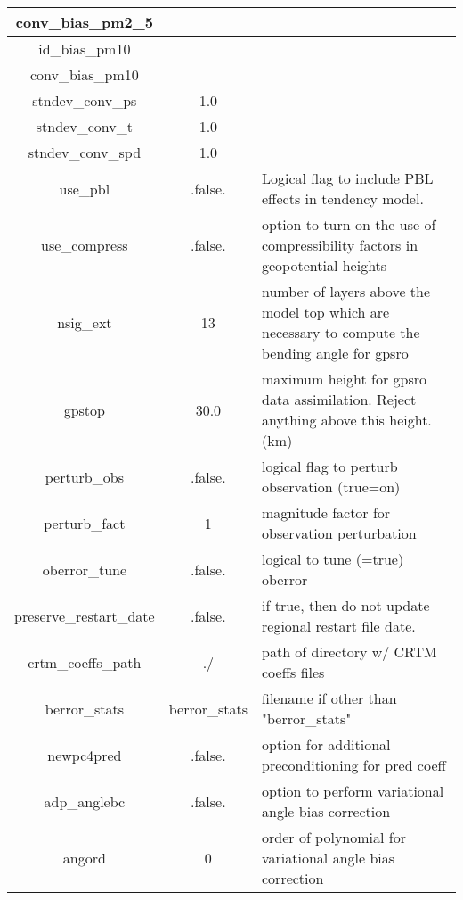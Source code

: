 \begin{table}[h]
\begin{tabular}{| c | c | p{9cm} |}
  \hline
  conv\_bias\_pm2\_5 & & \\
  \hline
  id\_bias\_pm10 & & \\
  \hline
  conv\_bias\_pm10 & & \\
  \hline
  stndev\_conv\_ps & 1.0 &  \\	
  \hline
  stndev\_conv\_t & 1.0	& \\
  \hline
  stndev\_conv\_spd & 1.0 & \\	
  \hline
  use\_pbl & .false.	& Logical flag to include PBL effects in tendency model. \\
  \hline
  use\_compress & .false. & option to turn on the use of compressibility factors in geopotential heights \\
  \hline
  nsig\_ext & 13 & number of layers above the model top which are necessary to compute the bending angle for gpsro \\
  \hline
  gpstop & 30.0 & maximum height for gpsro data assimilation. Reject anything above this height. (km) \\
  \hline
  perturb\_obs & .false. &  logical flag to perturb observation (true=on) \\
  \hline
  perturb\_fact & 1 & magnitude factor for observation perturbation \\
  \hline
  oberror\_tune & .false. & logical to tune (=true) oberror \\
  \hline
  preserve\_restart\_date & .false. & if true, then do not update regional restart file date. \\
  \hline
  crtm\_coeffs\_path & ./ & path of directory w/ CRTM coeffs files \\
  \hline
  berror\_stats	& berror\_stats & filename if other than "berror\_stats" \\
  \hline
  newpc4pred & .false. & option for additional preconditioning for pred coeff \\
  \hline
  adp\_anglebc & .false. & option to perform variational angle bias correction \\
  \hline
  angord & 0 & order of polynomial for variational angle bias correction \\
  \hline
  \end{tabular}
\end{table}
  
